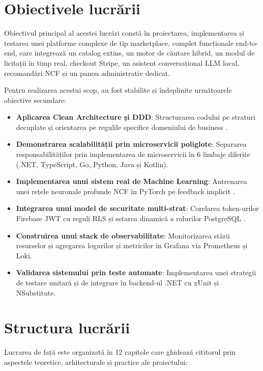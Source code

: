\section{Obiectivele lucrării}

Obiectivul principal al acestei lucrări constă în proiectarea, implementarea și testarea unei platforme complexe de tip marketplace, complet funcționale end-to-end, care integrează un catalog extins, un motor de căutare hibrid, un modul de licitații în timp real, checkout Stripe, un asistent conversațional LLM local, recomandări NCF și un panou administrativ dedicat.

Pentru realizarea acestui scop, au fost stabilite și îndeplinite următoarele obiective secundare:
\begin{itemize}
    \item \textbf{Aplicarea Clean Architecture și DDD}: Structurarea codului pe straturi decuplate și orientarea pe regulile specifice domeniului de business \cite{martin2017clean, evans2003ddd}.
    \item \textbf{Demonstrarea scalabilității prin microservicii poliglote}: Separarea responsabilităților prin implementarea de microservicii în 6 limbaje diferite (.NET, TypeScript, Go, Python, Java și Kotlin).
    \item \textbf{Implementarea unui sistem real de Machine Learning}: Antrenarea unei rețele neuronale profunde NCF în PyTorch pe feedback implicit \cite{he2017ncf}.
    \item \textbf{Integrarea unui model de securitate multi-strat}: Corelarea token-urilor Firebase JWT cu reguli RLS și setarea dinamică a rolurilor PostgreSQL \cite{postgresql2026rls, firebase2026auth}.
    \item \textbf{Construirea unui stack de observabilitate}: Monitorizarea stării resurselor și agregarea logurilor și metricilor în Grafana via Prometheus și Loki.
    \item \textbf{Validarea sistemului prin teste automate}: Implementarea unei strategii de testare unitară și de integrare în backend-ul .NET cu xUnit și NSubstitute.
\end{itemize}

\section{Structura lucrării}

Lucrarea de față este organizată în 12 capitole care ghidează cititorul prin aspectele teoretice, arhitecturale și practice ale proiectului:

